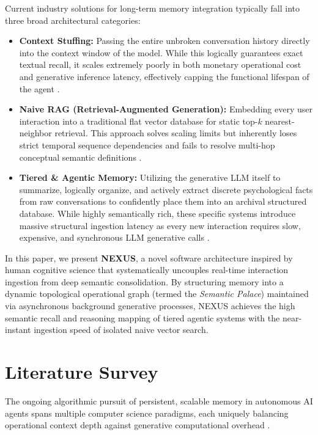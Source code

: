\documentclass[conference]{IEEEtran}
\begin{document}
Current industry solutions for long-term memory integration typically fall into three broad architectural categories:
\begin{itemize}
    \item \textbf{Context Stuffing:} Passing the entire unbroken conversation history directly into the context window of the model. While this logically guarantees exact textual recall, it scales extremely poorly in both monetary operational cost and generative inference latency, effectively capping the functional lifespan of the agent \cite{anthropic2023claude}.
    \item \textbf{Naive RAG (Retrieval-Augmented Generation):} Embedding every user interaction into a traditional flat vector database for static top-$k$ nearest-neighbor retrieval. This approach solves scaling limits but inherently loses strict temporal sequence dependencies and fails to resolve multi-hop conceptual semantic definitions \cite{lewis2020retrieval}.
    \item \textbf{Tiered \& Agentic Memory:} Utilizing the generative LLM itself to summarize, logically organize, and actively extract discrete psychological facts from raw conversations to confidently place them into an archival structured database. While highly semantically rich, these specific systems introduce massive structural ingestion latency as every new interaction requires slow, expensive, and synchronous LLM generative calls \cite{packer2023memgpt}.
\end{itemize}

In this paper, we present \textbf{NEXUS}, a novel software architecture inspired by human cognitive science \cite{tulving1972episodic} that systematically uncouples real-time interaction ingestion from deep semantic consolidation. By structuring memory into a dynamic topological operational graph (termed the \textit{Semantic Palace}) maintained via asynchronous background generative processes, NEXUS achieves the high semantic recall and reasoning mapping of tiered agentic systems with the near-instant ingestion speed of isolated naive vector search.

\section{Literature Survey}

The ongoing algorithmic pursuit of persistent, scalable memory in autonomous AI agents spans multiple computer science paradigms, each uniquely balancing operational context depth against generative computational overhead \cite{zhao2023expel}.
\end{document}
